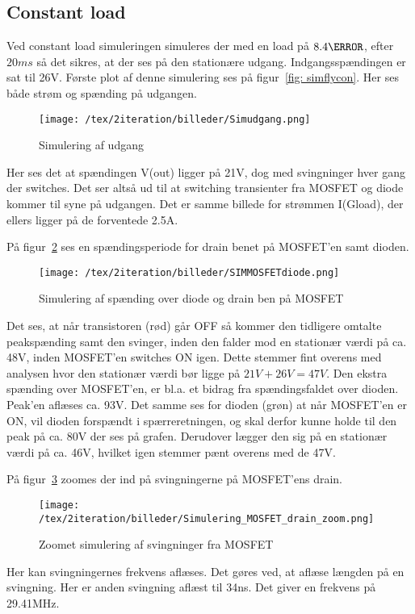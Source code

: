 

\subsection{Constant load} \label{constant}
Ved constant load simuleringen simuleres  der med en load på $8.4\ohm$, efter $20ms$ så det sikres, at der ses på den stationære udgang. Indgangsspændingen er sat til 26V.
Første plot af denne simulering ses på figur~\ref{fig: simflycon}. Her ses både strøm og spænding på udgangen.
\begin{figure}[H]
	\center
	\texttt{[image: /tex/2iteration/billeder/Simudgang.png]}
	\caption{Simulering af udgang}
	\label{fig: simudgang}
\end{figure}
Her ses det at spændingen V(out) ligger på 21V, dog med svingninger hver gang der switches. Det ser altså ud til at switching transienter fra MOSFET og diode kommer til syne på udgangen. Det er samme billede for strømmen I(Gload), der ellers ligger på de forventede 2.5A.

\noindent På figur~\ref{fig: simMOSdio} ses en spændingsperiode for drain benet på MOSFET'en samt dioden. 
\begin{figure}[H]
	\center
	\texttt{[image: /tex/2iteration/billeder/SIMMOSFETdiode.png]}
	\caption{Simulering af spænding over diode og drain ben på MOSFET}
	\label{fig: simMOSdio}
\end{figure}
Det ses, at når transistoren (rød) går OFF så kommer den tidligere omtalte peakspænding samt den svinger, inden den falder mod en stationær værdi på ca. 48V, inden MOSFET'en switches ON igen. Dette stemmer fint overens med analysen hvor den stationær værdi bør ligge på $21V+26V=47V$. Den ekstra spænding over MOSFET'en, er bl.a. et bidrag fra spændingsfaldet over dioden.
Peak'en aflæses ca. 93V.
Det samme ses for dioden (grøn) at når MOSFET'en er ON, vil dioden forspændt i spærreretningen, og skal derfor kunne holde til den peak på ca. 80V der ses på grafen. Derudover lægger den sig på en stationær værdi på ca. 46V, hvilket igen stemmer pænt overens med de 47V. 

\noindent På figur~\ref{fig: simMOSzoom} zoomes der ind på svingningerne på MOSFET'ens drain.
\begin{figure}[H]
	\center
	\texttt{[image: /tex/2iteration/billeder/Simulering\_MOSFET\_drain\_zoom.png]}
	\caption{Zoomet simulering af svingninger fra MOSFET}
	\label{fig: simMOSzoom}
\end{figure}
Her kan svingningernes frekvens aflæses. Det gøres ved, at aflæse længden på en svingning. Her er anden svingning aflæst til 34ns. Det giver en frekvens på 29.41MHz.

